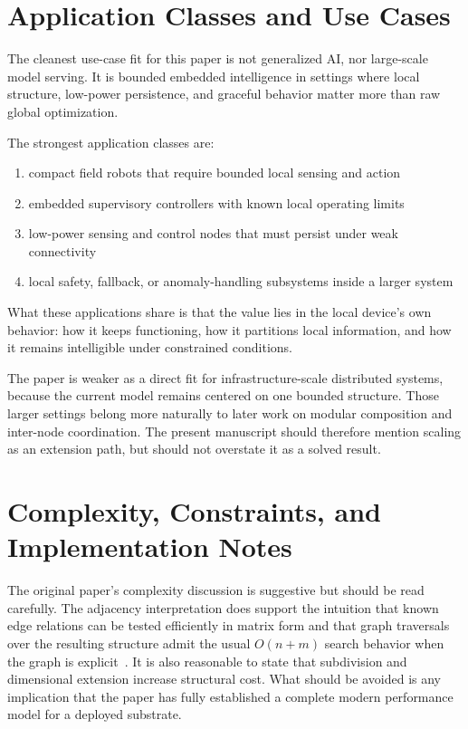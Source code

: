 \documentclass[11pt]{article}
\begin{document}
\section{Application Classes and Use Cases}

The cleanest use-case fit for this paper is not generalized AI, nor large-scale
model serving. It is bounded embedded intelligence in settings where local
structure, low-power persistence, and graceful behavior matter more than raw
global optimization.

The strongest application classes are:

\begin{enumerate}
\item compact field robots that require bounded local sensing and action
\item embedded supervisory controllers with known local operating limits
\item low-power sensing and control nodes that must persist under weak
connectivity
\item local safety, fallback, or anomaly-handling subsystems inside a larger
system
\end{enumerate}

What these applications share is that the value lies in the local device's own
behavior: how it keeps functioning, how it partitions local information, and
how it remains intelligible under constrained conditions.

The paper is weaker as a direct fit for infrastructure-scale distributed
systems, because the current model remains centered on one bounded structure.
Those larger settings belong more naturally to later work on modular
composition and inter-node coordination. The present manuscript should
therefore mention scaling as an extension path, but should not overstate it as
a solved result.

\section{Complexity, Constraints, and Implementation Notes}

The original paper's complexity discussion is suggestive but should be read
carefully. The adjacency interpretation does support the intuition that known
edge relations can be tested efficiently in matrix form and that graph
traversals over the resulting structure admit the usual $O(n + m)$ search
behavior when the graph is explicit~\cite{orlin2010}. It is also reasonable to
state that subdivision and dimensional extension increase structural cost. What
should be avoided is any implication that the paper has fully established a
complete modern performance model for a deployed substrate.
\end{document}
